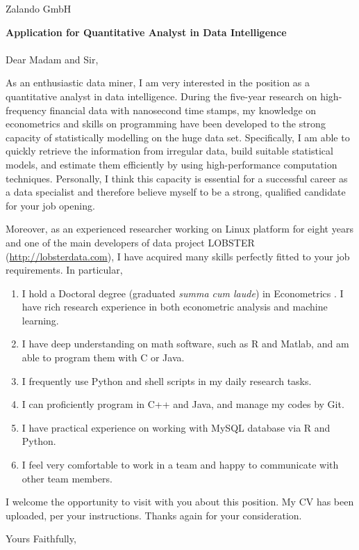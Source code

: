 \documentclass[a4paper, 11pt]{letter}
\begin{document}
 
\begin{letter}{%
Zalando GmbH} 
\opening{\textbf{\large{Application for Quantitative Analyst in Data Intelligence}}\\
\vspace{-5pt}\\ Dear Madam and Sir,}
As an enthusiastic data miner, I am very interested in the position as a quantitative analyst in data intelligence. During the five-year research on high-frequency financial data with nanosecond time stamps, my knowledge on econometrics and skills on programming have been developed to the strong capacity of statistically modelling on the huge data set. Specifically, I am able to quickly retrieve the information from irregular data, build suitable statistical models, and estimate them efficiently by using high-performance computation techniques. Personally, I think this capacity is essential for a successful career as a data specialist and therefore believe myself to be a strong, qualified candidate for your job opening.     

Moreover, as an experienced researcher working on Linux platform for eight years and one of the main developers of data project LOBSTER (\url{http://lobsterdata.com}), I have acquired many skills perfectly fitted to your job requirements. In particular, 
\begin{enumerate}
  \item I hold a Doctoral degree (graduated \emph{summa cum laude}) in Econometrics . I have rich research experience in both econometric analysis and machine learning.
  \item I have deep understanding on math software, such as R and Matlab, and am able to program them with C or Java.
  \item I frequently use Python and shell scripts in my daily research tasks.
  \item I can proficiently program in C++ and Java, and manage my codes by Git.
  \item I have practical experience on working with MySQL database via R and Python.
  \item I feel very comfortable to work in a team and happy to communicate with other team members.
\end{enumerate}
I welcome the opportunity to visit with you about this position. My CV has been uploaded, per your instructions. Thanks again for your consideration.
 
\closing{Yours Faithfully,}
 
 
\end{letter}
 
\end{document}
